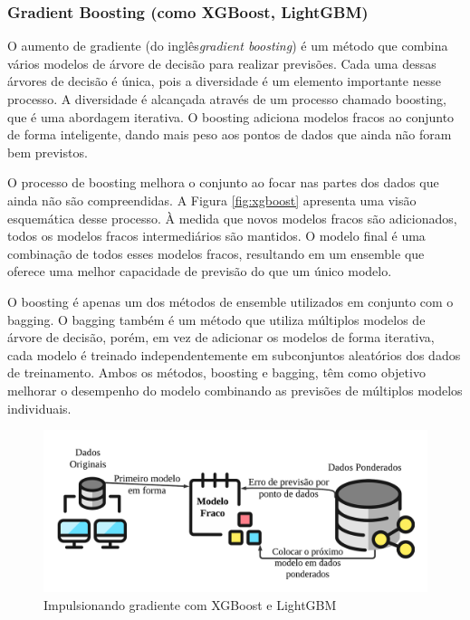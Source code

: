 \subsubsection{Gradient Boosting (como XGBoost, LightGBM)}\label{subsubsec:lgbxgb}

O aumento de gradiente (do inglês\textit{gradient boosting}) é um método que combina vários modelos de árvore de decisão para realizar previsões. Cada uma dessas árvores de decisão é única, pois a diversidade é um elemento importante nesse processo. A diversidade é alcançada através de um processo chamado boosting, que é uma abordagem iterativa. O boosting adiciona modelos fracos ao conjunto de forma inteligente, dando mais peso aos pontos de dados que ainda não foram bem previstos. 

O processo de boosting melhora o conjunto ao focar nas partes dos dados que ainda não são compreendidas. A Figura \ref{fig:xgboost} apresenta uma visão esquemática desse processo. À medida que novos modelos fracos são adicionados, todos os modelos fracos intermediários são mantidos. O modelo final é uma combinação de todos esses modelos fracos, resultando em um ensemble que oferece uma melhor capacidade de previsão do que um único modelo.

O boosting é apenas um dos métodos de ensemble utilizados em conjunto com o bagging. O bagging também é um método que utiliza múltiplos modelos de árvore de decisão, porém, em vez de adicionar os modelos de forma iterativa, cada modelo é treinado independentemente em subconjuntos aleatórios dos dados de treinamento. Ambos os métodos, boosting e bagging, têm como objetivo melhorar o desempenho do modelo combinando as previsões de múltiplos modelos individuais.


\begin{figure}[H]
	\centering
	\caption{Impulsionando gradiente com XGBoost e LightGBM}
	\label{fig:xgboos}
	\includegraphics[width=1\linewidth]{Modelos/Figuras/xgboos}
	
\end{figure}



